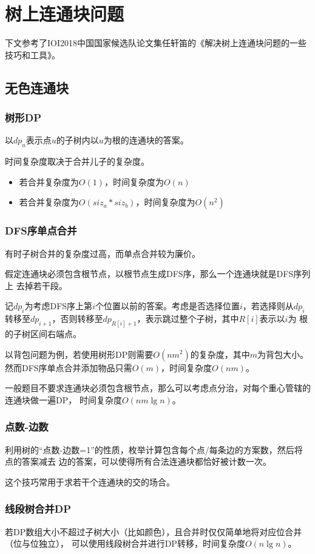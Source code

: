 \section{树上连通块问题}
下文参考了IOI2018中国国家候选队论文集任轩笛的《解决树上连通块问题的一些技巧和工具》。

\subsection{无色连通块}
\subsubsection{树形DP}
以$dp_u$表示点$u$的子树内以$u$为根的连通块的答案。

时间复杂度取决于合并儿子的复杂度。
\begin{itemize}
    \item 若合并复杂度为$O(1)$，时间复杂度为$O(n)$
    \item 若合并复杂度为$O(siz_a*siz_b)$，时间复杂度为$O(n^2)$
\end{itemize}

\subsubsection{DFS序单点合并}
有时子树合并的复杂度过高，而单点合并较为廉价。

假定连通块必须包含根节点，以根节点生成DFS序，那么一个连通块就是DFS序列上
去掉若干段。

记$dp_i$为考虑DFS序上第$i$个位置以前的答案。考虑是否选择位置$i$，若选择则从$dp_{i}$
转移至$dp_{i+1}$，否则转移至$dp_{R[i]+1}$，表示跳过整个子树，其中$R[i]$表示以$i$为
根的子树区间右端点。

以背包问题为例，若使用树形DP则需要$O(nm^2)$的复杂度，其中$m$为背包大小。
然而DFS序单点合并添加物品只需$O(m)$，时间复杂度$O(nm)$。

一般题目不要求连通块必须包含根节点，那么可以考虑点分治，对每个重心管辖的连通块做一遍DP，
时间复杂度$O(nm\lg n)$。
\subsubsection{点数-边数}
利用树的``点数-边数=1''的性质，枚举计算包含每个点/每条边的方案数，然后将点的答案减去
边的答案，可以使得所有合法连通块都恰好被计数一次。

这个技巧常用于求若干个连通块的交的场合。
\subsubsection{线段树合并DP}
若DP数组大小不超过子树大小（比如颜色），且合并时仅仅简单地将对应位合并（位与位独立），
可以使用线段树合并进行DP转移，时间复杂度$O(n\lg n)$。

